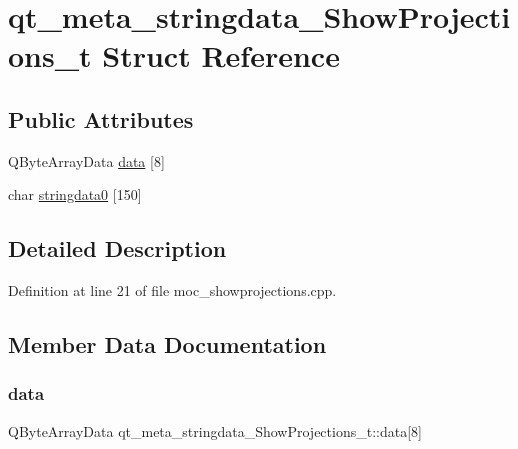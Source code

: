 \hypertarget{structqt__meta__stringdata___show_projections__t}{}\section{qt\+\_\+meta\+\_\+stringdata\+\_\+\+Show\+Projections\+\_\+t Struct Reference}
\label{structqt__meta__stringdata___show_projections__t}
\subsection*{Public Attributes}
\begin{DoxyCompactItemize}
\item 
Q\+Byte\+Array\+Data \mbox{\hyperlink{structqt__meta__stringdata___show_projections__t_ad29371ea2a69e8ca9aafddbe5c999c15}{data}} \mbox{[}8\mbox{]}
\item 
char \mbox{\hyperlink{structqt__meta__stringdata___show_projections__t_ac38af3ba9c6d74086b384b5d28cfa298}{stringdata0}} \mbox{[}150\mbox{]}
\end{DoxyCompactItemize}


\subsection{Detailed Description}


Definition at line 21 of file moc\+\_\+showprojections.\+cpp.



\subsection{Member Data Documentation}
\mbox{\label{structqt__meta__stringdata___show_projections__t_ad29371ea2a69e8ca9aafddbe5c999c15}} 
\subsubsection{\texorpdfstring{data}{data}}
{\footnotesize\ttfamily Q\+Byte\+Array\+Data qt\+\_\+meta\+\_\+stringdata\+\_\+\+Show\+Projections\+\_\+t\+::data\mbox{[}8\mbox{]}}



